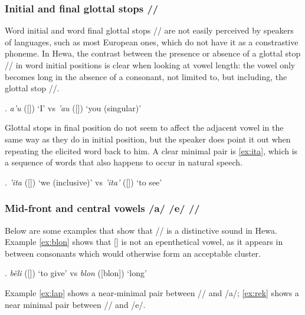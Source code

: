 \documentclass{article}
\begin{document}
\subsubsection{Initial and final glottal stops /\textglotstop/}

Word initial and word final glottal stops /\textglotstop / are not easily perceived by speakers of languages, such as most European ones, which do not have it as a constrastive phoneme. In Hewa, the contrast between the presence or absence of a glottal stop /\textglotstop / in word initial positions is clear when looking at vowel length: the vowel only becomes long in the absence of a consonant, not limited to, but including, the glottal stop /\textglotstop /.

\ex. \textit{a'u} ([]) `I' vs \textit{'au} ([]) `you (singular)'

Glottal stops in final position do not seem to affect the adjacent vowel in the same way as they do in initial position, but the speaker does point it out when repeating the elicited word back to him. A clear minimal pair is \ref{ex:ita}, which is a sequence of words that also happens to occur in natural speech.

\ex. \label{ex:ita} \textit{'ita} ([]) `we (inclusive)' vs \textit{'ita'} ([]) `to see'

\subsubsection{Mid-front and central vowels /a/ /e/ /\textschwa/}

Below are some examples that show that /\textschwa / is a distinctive sound in Hewa. Example \ref{ex:blon} shows that [\textschwa] is not an epenthetical vowel, as it appears in between consonants which would otherwise form an acceptable cluster.

\ex. \label{ex:blon} \textit{bëli} ([]) `to give' vs \textit{blon} ([blon]) `long'



Example \ref{ex:lap} shows a near-minimal pair between /\textschwa / and /a/; \ref{ex:rek} shows a near minimal pair between /\textschwa / and /e/.
\end{document}
